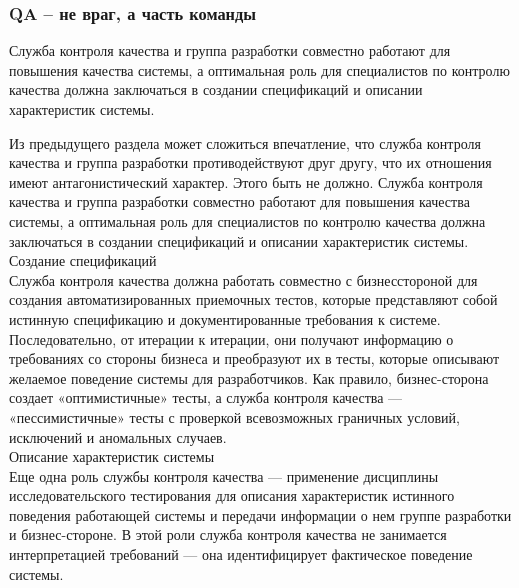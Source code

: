 \documentclass{../industrial-development}
\begin{document}
\begin{frame} \frametitle{QA – не враг, а часть команды}
  \begin{block}{}
	Служба контроля качества и группа разработки совместно работают для повышения качества системы, а оптимальная роль для специалистов по контролю качества должна заключаться в создании спецификаций и описании характеристик системы.
  \end{block}
\end{frame}
\lecturenotes
Из предыдущего раздела может сложиться впечатление, что служба контроля качества и группа разработки противодействуют друг другу, что их отношения имеют антагонистический характер. Этого быть не должно. Служба контроля качества и группа разработки совместно работают для повышения качества системы, а оптимальная роль для специалистов по контролю качества должна заключаться в создании спецификаций и описании характеристик системы.\\
Создание спецификаций\\
Служба контроля качества должна работать совместно с бизнесстороной для создания автоматизированных приемочных тестов, которые представляют собой истинную спецификацию и документированные требования к системе. Последовательно, от итерации к итерации, они получают информацию о требованиях со стороны бизнеса и преобразуют их в тесты, которые описывают желаемое поведение системы для разработчиков. Как правило, бизнес-сторона создает «оптимистичные» тесты, а служба контроля качества — «пессимистичные» тесты с проверкой всевозможных граничных условий, исключений и аномальных случаев.\\
Описание характеристик системы\\
Еще одна роль службы контроля качества — применение дисциплины исследовательского тестирования для описания характеристик истинного поведения работающей системы и передачи информации о нем группе разработки и бизнес-стороне. В этой роли служба контроля качества не занимается интерпретацией требований — она идентифицирует фактическое поведение системы.
\end{document}
